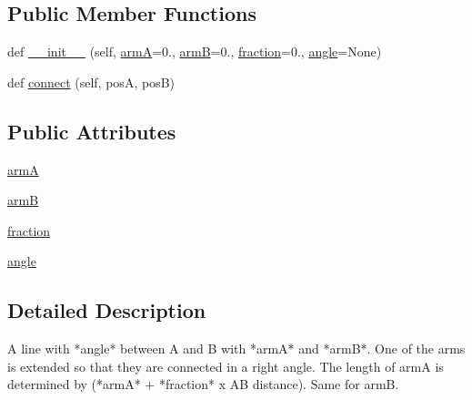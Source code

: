 \subsection*{Public Member Functions}
\begin{DoxyCompactItemize}
\item 
def \hyperlink{classmatplotlib_1_1patches_1_1ConnectionStyle_1_1Bar_aa9789d2ee165924bc7164b26ffea1254}{\+\_\+\+\_\+init\+\_\+\+\_\+} (self, \hyperlink{classmatplotlib_1_1patches_1_1ConnectionStyle_1_1Bar_a2d24fc93946d43dfdded8b2bb5a5410a}{armA}=0., \hyperlink{classmatplotlib_1_1patches_1_1ConnectionStyle_1_1Bar_a503f79d85a26610dedda5f458d1d0dfb}{armB}=0., \hyperlink{classmatplotlib_1_1patches_1_1ConnectionStyle_1_1Bar_a71fd92e92cb0bd171da926159deada1e}{fraction}=0., \hyperlink{classmatplotlib_1_1patches_1_1ConnectionStyle_1_1Bar_a1c2440188dfc232d0b9bd6e03c4abe1e}{angle}=None)
\item 
def \hyperlink{classmatplotlib_1_1patches_1_1ConnectionStyle_1_1Bar_a3b28912b6bd986c0e393121f2bb2d624}{connect} (self, posA, posB)
\end{DoxyCompactItemize}
\subsection*{Public Attributes}
\begin{DoxyCompactItemize}
\item 
\hyperlink{classmatplotlib_1_1patches_1_1ConnectionStyle_1_1Bar_a2d24fc93946d43dfdded8b2bb5a5410a}{armA}
\item 
\hyperlink{classmatplotlib_1_1patches_1_1ConnectionStyle_1_1Bar_a503f79d85a26610dedda5f458d1d0dfb}{armB}
\item 
\hyperlink{classmatplotlib_1_1patches_1_1ConnectionStyle_1_1Bar_a71fd92e92cb0bd171da926159deada1e}{fraction}
\item 
\hyperlink{classmatplotlib_1_1patches_1_1ConnectionStyle_1_1Bar_a1c2440188dfc232d0b9bd6e03c4abe1e}{angle}
\end{DoxyCompactItemize}


\subsection{Detailed Description}
\begin{DoxyVerb}A line with *angle* between A and B with *armA* and
*armB*. One of the arms is extended so that they are connected in
a right angle. The length of armA is determined by (*armA*
+ *fraction* x AB distance). Same for armB.
\end{DoxyVerb}
 

